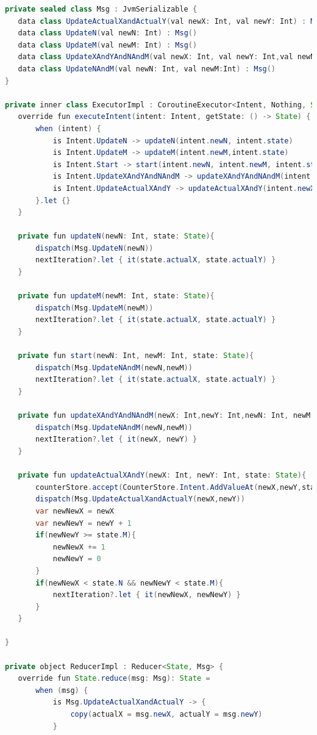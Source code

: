 \begin{lstlisting}[language=java]
private sealed class Msg : JvmSerializable {
   data class UpdateActualXandActualY(val newX: Int, val newY: Int) : Msg()
   data class UpdateN(val newN: Int) : Msg()
   data class UpdateM(val newM: Int) : Msg()
   data class UpdateXAndYAndNAndM(val newX: Int, val newY: Int,val newN: Int, val newM:Int) : Msg()
   data class UpdateNAndM(val newN: Int, val newM:Int) : Msg()
}

private inner class ExecutorImpl : CoroutineExecutor<Intent, Nothing, State, Msg, Nothing>() {
   override fun executeIntent(intent: Intent, getState: () -> State) {
       when (intent) {
           is Intent.UpdateN -> updateN(intent.newN, intent.state)
           is Intent.UpdateM -> updateM(intent.newM,intent.state)
           is Intent.Start -> start(intent.newN, intent.newM, intent.state)
           is Intent.UpdateXAndYAndNAndM -> updateXAndYAndNAndM(intent.newX, intent.newY, intent.newN, intent.newM)
           is Intent.UpdateActualXAndY -> updateActualXAndY(intent.newX, intent.newY, intent.state)
       }.let {}
   }

   private fun updateN(newN: Int, state: State){
       dispatch(Msg.UpdateN(newN))
       nextIteration?.let { it(state.actualX, state.actualY) }
   }

   private fun updateM(newM: Int, state: State){
       dispatch(Msg.UpdateM(newM))
       nextIteration?.let { it(state.actualX, state.actualY) }
   }

   private fun start(newN: Int, newM: Int, state: State){
       dispatch(Msg.UpdateNAndM(newN,newM))
       nextIteration?.let { it(state.actualX, state.actualY) }
   }

   private fun updateXAndYAndNAndM(newX: Int,newY: Int,newN: Int, newM: Int){
       dispatch(Msg.UpdateNAndM(newN,newM))
       nextIteration?.let { it(newX, newY) }
   }

   private fun updateActualXAndY(newX: Int, newY: Int, state: State){
       counterStore.accept(CounterStore.Intent.AddValueAt(newX,newY,state.values,counterStore.state))
       dispatch(Msg.UpdateActualXandActualY(newX,newY))
       var newNewX = newX
       var newNewY = newY + 1
       if(newNewY >= state.M){
           newNewX += 1
           newNewY = 0
       }
       if(newNewX < state.N && newNewY < state.M){
           nextIteration?.let { it(newNewX, newNewY) }
       }
   }

}

private object ReducerImpl : Reducer<State, Msg> {
   override fun State.reduce(msg: Msg): State =
       when (msg) {
           is Msg.UpdateActualXandActualY -> {
               copy(actualX = msg.newX, actualY = msg.newY)
           }


\end{lstlisting}
